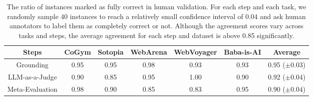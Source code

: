 \documentclass[../main.tex]{subfiles}
\begin{document}
\begin{table}[!h]
	\centering
	\small
	\caption{ The ratio of instances marked as fully correct in human validation.
	For each step and each task, we randomly sample 40 instances to reach a relatively
	small confidence interval of $0.04$ and ask human annotators to label them as completely
	correct or not. Although the agreement scores vary across tasks and steps, the
	average agreement for each step and dataset is above 0.85 significantly. }
	\begin{tabular}{cccccc|c}
		\toprule Steps     & CoGym & Sotopia & WebArena & WebVoyager & Baba-is-AI & Average           \\
		\midrule Grounding & 0.95  & 0.95    & 0.98     & 0.93       & 0.93       & 0.95 ($\pm 0.03$) \\
		LLM-as-a-Judge     & 0.90  & 0.85    & 0.95     & 1.00       & 0.90       & 0.92 ($\pm 0.04$) \\
		Meta-Evaluation    & 0.98  & 0.90    & 0.85     & 0.83       & 0.95       & 0.90 ($\pm 0.04$) \\
		\bottomrule
	\end{tabular}

	\label{tab:validation}
\end{table}

\end{document}
